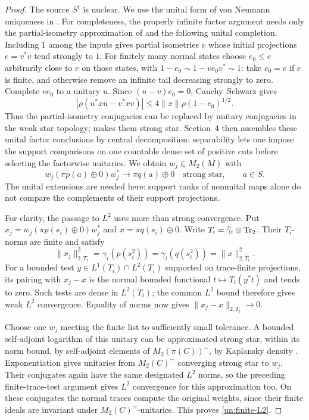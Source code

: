 \begin{proof}
The source $S^\dagger$ is nuclear.  We use the unital form of von Neumann
uniqueness in \cite[Proposition~2.1, Corollary~3.10, and Section~4]{CGNN}.
For completeness, the properly infinite factor argument needs only the
partial-isometry approximation of \cite[Lemma~3.6]{CGNN} and the following
unital completion.  Including $1$ among the inputs gives partial
isometries $v$ whose initial projections $e=v^*v$ tend strongly to $1$.
For finitely many normal states choose $e_0\leq e$ arbitrarily close to
$e$ on those states, with
$1-e_0\sim1-ve_0v^*\sim1$: take $e_0=e$ if $e$ is finite, and otherwise
remove an infinite tail decreasing strongly to zero.  Complete $ve_0$
to a unitary $u$.  Since $(u-v)e_0=0$, Cauchy--Schwarz gives
\[
 |\rho(u^*xu-v^*xv)|\leq4\|x\|\rho(1-e_0)^{1/2}.
\]
Thus the partial-isometry conjugacies can be replaced by unitary
conjugacies in the weak star topology; \cite[Lemma~3.9]{CGNN} makes
them strong star.  Section~4 then assembles these unital factor conclusions by
central decomposition; separability lets one impose the support
comparisons on one countable dense set of positive cuts before
selecting the factorwise unitaries.  We obtain $w_j\in M_2(M)$ with
\[
 w_j(\pi p(a)\oplus0)w_j^*\longrightarrow\pi q(a)\oplus0
 \quad\text{strong star},\qquad a\in S.
\]
The unital extensions are needed here: support ranks of nonunital maps
alone do not compare the complements of their support projections.

For clarity, the passage to $L^2$ uses more than strong convergence.
Put $x_j=w_j(\pi p(s_i)\oplus0)w_j^*$ and
$x=\pi q(s_i)\oplus0$.  Write
$T_i=\widehat\gamma_i\otimes\operatorname{Tr}_2$.  Their $T_i$-norms are finite and satisfy
\[
 \|x_j\|_{2,T_i}^2
 =\gamma_i(p(s_i^2))
 =\gamma_i(q(s_i^2))
 =\|x\|_{2,T_i}^2.
\]
For a bounded test $y\in L^1(T_i)\cap
L^2(T_i)$ supported on trace-finite projections, its
pairing with $x_j-x$ is the normal bounded functional
$t\mapsto T_i(y^*t)$ and tends to zero.  Such tests
are dense in $L^2(T_i)$; the common
$L^2$ bound therefore gives weak $L^2$ convergence.  Equality of norms
now gives $\|x_j-x\|_{2,T_i}\to0$.

Choose one $w_j$ meeting the finite list to sufficiently small
tolerance.  A bounded self-adjoint logarithm of this unitary can be
approximated strong star, within its norm bound, by self-adjoint
elements of $M_2(\pi(C))^{\sim}$, by Kaplansky density
\cite[Theorem~1]{KaplanskyDensity}.  Exponentiation
gives unitaries from $M_2(C)^{\sim}$ converging strong star to $w_j$.
Their conjugates again have the same designated $L^2$ norms, so the
preceding finite-trace-test argument gives $L^2$ convergence for this
approximation too.  On these conjugates the normal traces compute
the original weights, since their finite ideals are invariant under
$M_2(C)^{\sim}$-unitaries.  This proves \eqref{un:finite-L2}.
\end{proof}

